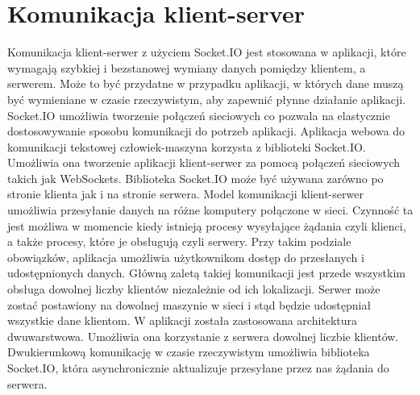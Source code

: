 \section{Komunikacja klient-server}
Komunikacja klient-serwer z użyciem Socket.IO jest stosowana w aplikacji, które wymagają szybkiej i bezstanowej wymiany danych pomiędzy klientem, a serwerem. Może to być przydatne w przypadku aplikacji, w których dane muszą być wymieniane w czasie rzeczywistym, aby zapewnić płynne działanie aplikacji. Socket.IO umożliwia tworzenie połączeń sieciowych co pozwala na elastycznie dostosowywanie sposobu komunikacji do potrzeb aplikacji. Aplikacja webowa do komunikacji tekstowej człowiek-maszyna korzysta z biblioteki Socket.IO. Umożliwia ona tworzenie aplikacji klient-serwer za pomocą połączeń sieciowych takich jak WebSockets. Biblioteka Socket.IO może być używana zarówno po stronie klienta jak i na stronie serwera. Model komunikacji klient-serwer umożliwia przesyłanie danych na różne komputery połączone w sieci. Czynność ta jest możliwa w momencie kiedy istnieją procesy wysyłające żądania czyli klienci, a także procesy, które je obsługują czyli serwery. Przy takim podziale obowiązków, aplikacja umożliwia użytkownikom dostęp do przesłanych i udostępnionych danych. Główną zaletą takiej komunikacji jest przede wszystkim obsługa dowolnej liczby klientów niezależnie od ich lokalizacji. Serwer może zostać postawiony na dowolnej maszynie w sieci i stąd będzie udostępniał wszystkie dane klientom. W aplikacji została zastosowana architektura dwuwarstwowa. Umożliwia ona korzystanie z serwera dowolnej liczbie klientów. Dwukierunkową komunikację w czasie rzeczywistym umożliwia biblioteka Socket.IO, która asynchronicznie aktualizuje przesyłane przez nas żądania do serwera. 

